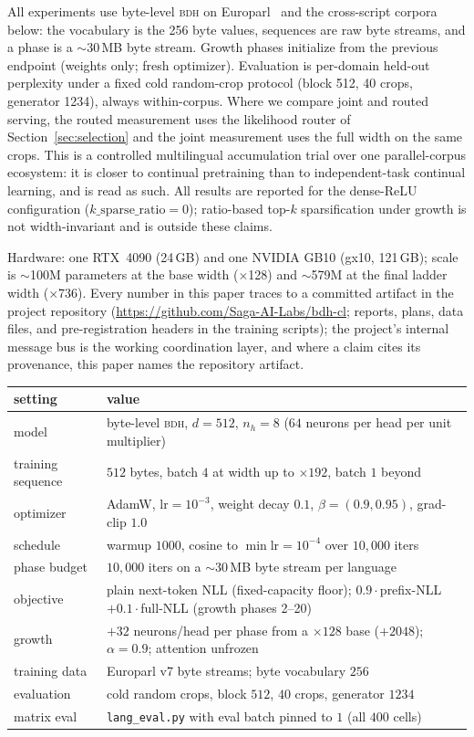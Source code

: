 \documentclass[11pt]{article}
\theoremstyle{definition}\newtheorem{definition}{Definition}
\theoremstyle{remark}\newtheorem{remark}{Remark}
\newcommand{\BDH}{\textsc{bdh}}
\begin{document}
All experiments use byte-level \BDH{} on Europarl~\cite{europarl} and the cross-script corpora below: the vocabulary is the 256 byte values, sequences are
raw byte streams, and a phase is a $\sim$30\,MB byte stream. Growth phases initialize from
the previous endpoint (weights only; fresh optimizer). Evaluation is per-domain held-out
perplexity under a fixed cold random-crop protocol (block 512, 40 crops, generator 1234),
always within-corpus. Where we compare joint and routed serving, the routed measurement uses
the likelihood router of Section~\ref{sec:selection} and the joint measurement uses the full
width on the same crops. This is a controlled multilingual accumulation trial over one parallel-corpus
ecosystem: it is closer to continual pretraining than to independent-task continual learning, and
is read as such. All results are reported for the dense-ReLU configuration
($k\_\mathrm{sparse\_ratio}=0$); ratio-based top-$k$ sparsification under growth is not width-invariant
and is outside these claims.

Hardware: one RTX~4090 (24\,GB) and one NVIDIA GB10 (gx10, 121\,GB); scale is $\sim$100M
parameters at the base width ($\times$128) and $\sim$579M at the final ladder width
($\times$736). Every number in this paper traces to a committed artifact in the project repository
(\url{https://github.com/Saga-AI-Labs/bdh-cl}; reports, plans, data files, and
pre-registration headers in the training scripts); the project's internal message bus is
the working coordination layer, and where a claim cites its provenance, this paper names
the repository artifact.

\begin{center}\small
\begin{tabular}{ll}
\toprule
setting & value \\
\midrule
model & byte-level \BDH{}, $d=512$, $n_h=8$ ($64$ neurons per head per unit multiplier) \\
training sequence & $512$ bytes, batch $4$ at width up to $\times192$, batch $1$ beyond \\
optimizer & AdamW, $\mathrm{lr}=10^{-3}$, weight decay $0.1$, $\beta=(0.9,0.95)$, grad-clip $1.0$ \\
schedule & warmup $1000$, cosine to $\min\mathrm{lr}=10^{-4}$ over $10{,}000$ iters \\
phase budget & $10{,}000$ iters on a $\sim$30\,MB byte stream per language \\
objective & plain next-token NLL (fixed-capacity floor); $0.9\cdot$prefix-NLL $+0.1\cdot$full-NLL (growth phases 2--20) \\
growth & $+32$ neurons/head per phase from a $\times128$ base ($+2048$); $\alpha=0.9$; attention unfrozen \\
training data & Europarl v7 byte streams; byte vocabulary $256$ \\
evaluation & cold random crops, block $512$, $40$ crops, generator $1234$ \\
matrix eval & \texttt{lang\_eval.py} with eval batch pinned to $1$ (all $400$ cells) \\
\bottomrule
\end{tabular}
\end{center}
\end{document}
